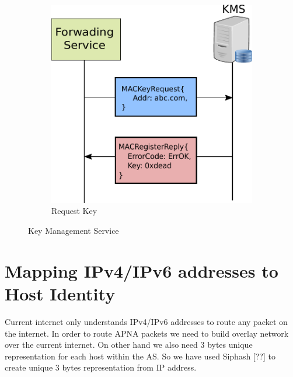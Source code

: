 \begin{figure}[th!]
\begin{subfigure}{.5\textwidth}
  \includegraphics[width=0.95\linewidth]{Figures/kms_request.pdf}
  \caption[MAC Key Request]{Request Key}
  \label{fig:kms_request}
\end{subfigure}
\caption{Key Management Service}
\label{fig:kms}
\end{figure}

\section{Mapping IPv4/IPv6 addresses to Host Identity} \label{sec:ims}
Current internet only understands IPv4/IPv6 addresses to route any packet on the internet. In order to route APNA packets we need to build overlay network over the current internet. On other hand we also need 3 bytes unique representation for each host within the AS. So we have used Siphash [??] to create unique 3 bytes representation from IP address.

